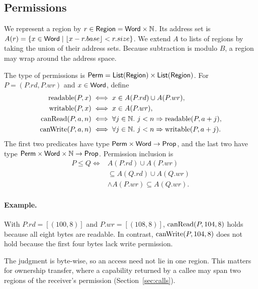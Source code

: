 \subsection{Permissions}
We represent a region by $r\in\mathsf{Region}=\mathsf{Word}\times\mathbb{N}$. Its address set is $A(r)=\{x\in\mathsf{Word}\mid\lfloor x-r.base\rfloor<r.size\}$. We extend $A$ to lists of regions by taking the union of their address sets. Because subtraction is modulo $B$, a region may wrap around the address space.

\begin{definition}\label{def:perm}
The type of permissions is $\mathsf{Perm}=\mathsf{List}(\mathsf{Region})\times\mathsf{List}(\mathsf{Region})$. For $P=(P.rd,P.wr)$ and $x\in\mathsf{Word}$, define
\[
\begin{aligned}
\mathrm{readable}(P,x)&\iff x\in A(P.rd)\cup A(P.wr),\\
\mathrm{writable}(P,x)&\iff x\in A(P.wr),\\
\canRead(P,a,n)&\iff\forall j\in\N.\ j<n\Rightarrow\mathrm{readable}(P,a+j),\\
\canWrite(P,a,n)&\iff\forall j\in\N.\ j<n\Rightarrow\mathrm{writable}(P,a+j).
\end{aligned}
\]
The first two predicates have type $\mathsf{Perm}\times\mathsf{Word}\to\mathsf{Prop}$, and the last two have type $\mathsf{Perm}\times\mathsf{Word}\times\mathbb{N}\to\mathsf{Prop}$. Permission inclusion is
\[
\begin{aligned}P\le Q\iff{}& A(P.rd)\cup A(P.wr)\\ &\subseteq A(Q.rd)\cup A(Q.wr)\\ &\land A(P.wr)\subseteq A(Q.wr).\end{aligned}
\]
\end{definition}

\paragraph{Example.} With $P.rd=[(100,8)]$ and $P.wr=[(108,8)]$, $\mathrm{canRead}(P,104,8)$ holds because all eight bytes are readable. In contrast, $\mathrm{canWrite}(P,104,8)$ does not hold because the first four bytes lack write permission.


The judgment is byte-wise, so an access need not lie in one region. This matters for ownership transfer, where a capability returned by a callee may span two regions of the receiver's permission (Section~\ref{sec:calls}).

